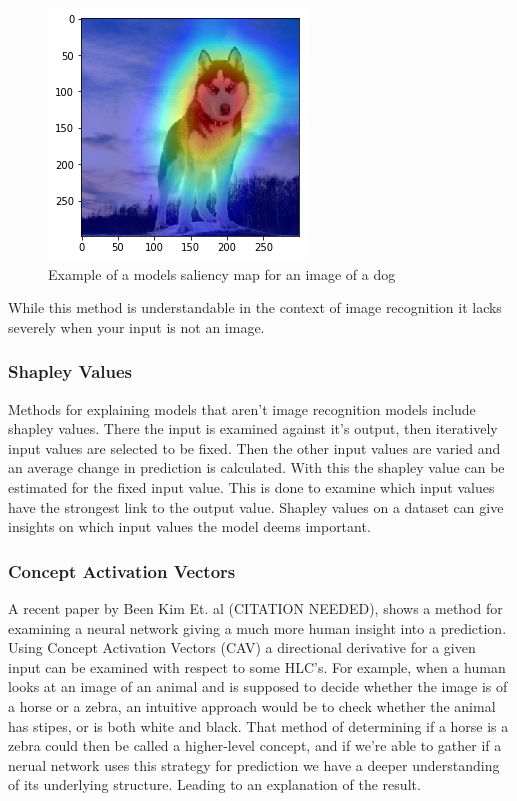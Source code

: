 \begin{figure}[]
  \centering
  \includegraphics[width=.5\textwidth]{graphics/dog_saliency}
  \caption{Example of a models saliency map for an image of a dog}
  \label{fig:dog_saliency}
\end{figure}

While this method is understandable in the context of image recognition it
lacks severely when your input is not an image.

\subsubsection{Shapley Values}

Methods for explaining models that aren't image recognition models include
shapley values. There the input is examined against it's output, then iteratively
input values are selected to be fixed. Then the other input values are varied and
an average change in prediction is calculated. With this the shapley value can be
estimated for the fixed input value. This is done to examine which input values have
the strongest link to the output value. Shapley values on a dataset can give insights
on which input values the model deems important.

\subsubsection{Concept Activation Vectors}

A recent paper by Been Kim Et. al (CITATION NEEDED), shows a method for examining
a neural network giving a much more human insight into a prediction. Using Concept
Activation Vectors (CAV) a directional derivative for a given input can be examined
with respect to some HLC's. For example, when a human looks at an image of an animal
and is supposed to decide whether the image is of a horse or a zebra, an intuitive
approach would be to check whether the animal has stipes, or is both white and black.
That method of determining if a horse is a zebra could then be called a higher-level
concept, and if we're able to gather if a nerual network uses this strategy for prediction 
we have a deeper understanding of its underlying structure. Leading to an explanation of 
the result.

